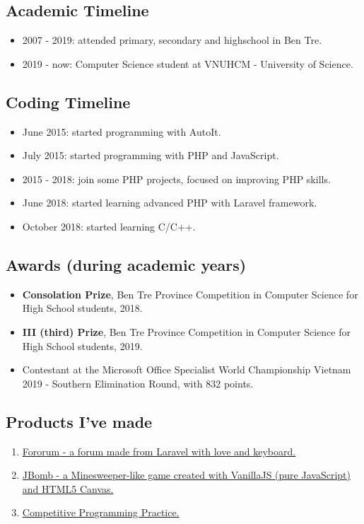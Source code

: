 \documentclass{article}
\begin{document}
        \subsection{Academic Timeline}
            \begin{itemize}
                \item 2007 - 2019: attended primary, secondary and highschool in Ben Tre.
                \item 2019 - now: Computer Science student at VNUHCM - University of Science.
            \end{itemize}

        \subsection{Coding Timeline}
            \begin{itemize}
                \item June 2015: started programming with AutoIt.
                \item July 2015: started programming with PHP and JavaScript.
                \item 2015 - 2018: join some PHP projects, focused on improving PHP skills.
                \item June 2018: started learning advanced PHP with Laravel framework.
                \item October 2018: started learning C/C++.
            \end{itemize}

        \subsection{Awards (during academic years)}
            \begin{itemize}
                \item {\textbf{Consolation Prize}}, Ben Tre Province Competition in Computer Science for High School students, 2018.
                \item {\textbf{III (third) Prize}}, Ben Tre Province Competition in Computer Science for High School students, 2019.
                \item Contestant at the Microsoft Office Specialist World Championship Vietnam 2019 - Southern Elimination Round, with 832 points.
            \end{itemize}

        \subsection{Products I've made}
            \begin{enumerate}
                \item \href{https://github.com/trhgquan/Fororum}{Fororum - a forum made from Laravel with love and keyboard.}
                \item \href{https://github.com/trhgquan/JBomb}{JBomb - a Minesweeper-like game created with VanillaJS (pure JavaScript) and HTML5 Canvas.}
                \item \href{https://github.com/trhgquan/CPP}{Competitive Programming Practice.}
            \end{enumerate}
\end{document}

